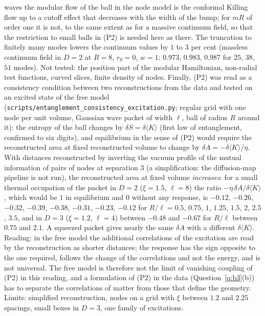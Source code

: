 \documentclass[11pt,a4paper]{article}
\theoremstyle{stmt}
\theoremstyle{defn}
\theoremstyle{rmk}
\numberwithin{equation}{section}
\begin{document}
waves the modular flow of the ball in the node model is the conformal Killing flow up to a cutoff effect that decreases with the width of the bump; for $mR$ of order one it is not, to the same extent as for a massive continuum field, so that the restriction to small balls in \textup{(P2)} is needed here as there. The truncation to finitely many modes lowers the continuum values by $1$ to $3$ per cent (massless continuum field in $D=2$ at $R=8$, $r_0=0$, $w=1$: $0.973$, $0.983$, $0.987$ for $25$, $38$, $51$ modes). Not tested: the position part of the modular Hamiltonian, non-radial test functions, curved slices, finite density of nodes. Finally, \textup{(P2)} was read as a consistency condition between two reconstructions from the data and tested on an excited state of the free model (\texttt{scripts/entanglement\_consistency\_excitation.py}; regular grid with one node per unit volume, Gaussian wave packet of width $\ell$, ball of radius $R$ around it): the entropy of the ball changes by $\delta S=\delta\langle K\rangle$ (first law of entanglement, confirmed to six digits), and equilibrium in the sense of \textup{(P2)} would require the reconstructed area at fixed reconstructed volume to change by $\delta A=-\delta\langle K\rangle/\eta$. With distances reconstructed by inverting the vacuum profile of the mutual information of pairs of nodes at separation $3$ (a simplification: the diffusion-map pipeline is not run), the reconstructed area at fixed volume \emph{increases}: for a small thermal occupation of the packet in $D=2$ ($\xi=1.5$, $\ell=8$) the ratio $-\eta\,\delta A/\delta\langle K\rangle$, which would be $1$ in equilibrium and $0$ without any response, is $-0.12$, $-0.26$, $-0.32$, $-0.39$, $-0.38$, $-0.31$, $-0.23$, $-0.12$ for $R/\ell=0.5$, $0.75$, $1$, $1.25$, $1.5$, $2$, $2.5$, $3.5$, and in $D=3$ ($\xi=1.2$, $\ell=4$) between $-0.48$ and $-0.67$ for $R/\ell$ between $0.75$ and $2.1$. A squeezed packet gives nearly the same $\delta A$ with a different $\delta\langle K\rangle$. Reading: in the free model the additional correlations of the excitation are read by the reconstruction as shorter distances; the response has the sign opposite to the one required, follows the change of the correlations and not the energy, and is not universal. The free model is therefore not the limit of vanishing coupling of \textup{(P2)} in this reading, and a formulation of \textup{(P2)} in the data (Question~\ref{q:b3}\textup{(b)}) has to separate the correlations of matter from those that define the geometry. Limits: simplified reconstruction, nodes on a grid with $\xi$ between $1.2$ and $2.25$ spacings, small boxes in $D=3$, one family of excitations.
\end{document}
